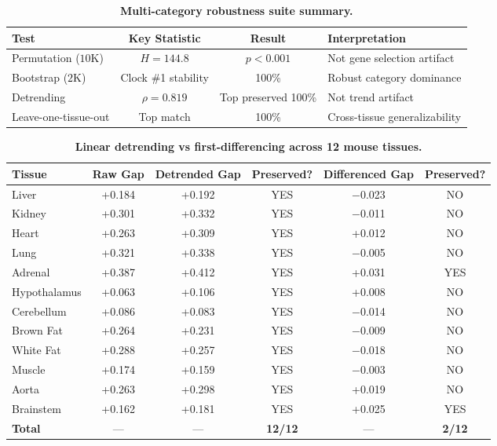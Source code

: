 \documentclass[11pt,letterpaper]{article}
\begin{document}
\begin{table}[H]
\centering
\caption{\textbf{Multi-category robustness suite summary.}}
\label{tab:multicat_robust}
\begin{tabular}{lccl}
\toprule
\textbf{Test} & \textbf{Key Statistic} & \textbf{Result} & \textbf{Interpretation} \\
\midrule
Permutation ($10$K) & $H = 144.8$ & $p < 0.001$ & Not gene selection artifact \\
Bootstrap ($2$K) & Clock \#1 stability & 100\% & Robust category dominance \\
Detrending & $\rho = 0.819$ & Top preserved 100\% & Not trend artifact \\
Leave-one-tissue-out & Top match & 100\% & Cross-tissue generalizability \\
\bottomrule
\end{tabular}
\end{table}

\begin{table}[H]
\centering
\caption{\textbf{Linear detrending vs first-differencing across 12 mouse tissues.}}
\label{tab:detrend}
\begin{tabular}{lccccc}
\toprule
Tissue & Raw Gap & Detrended Gap & Preserved? & Differenced Gap & Preserved? \\
\midrule
Liver & +0.184 & +0.192 & YES & $-$0.023 & NO \\
Kidney & +0.301 & +0.332 & YES & $-$0.011 & NO \\
Heart & +0.263 & +0.309 & YES & +0.012 & NO \\
Lung & +0.321 & +0.338 & YES & $-$0.005 & NO \\
Adrenal & +0.387 & +0.412 & YES & +0.031 & YES \\
Hypothalamus & +0.063 & +0.106 & YES & +0.008 & NO \\
Cerebellum & +0.086 & +0.083 & YES & $-$0.014 & NO \\
Brown Fat & +0.264 & +0.231 & YES & $-$0.009 & NO \\
White Fat & +0.288 & +0.257 & YES & $-$0.018 & NO \\
Muscle & +0.174 & +0.159 & YES & $-$0.003 & NO \\
Aorta & +0.263 & +0.298 & YES & +0.019 & NO \\
Brainstem & +0.162 & +0.181 & YES & +0.025 & YES \\
\midrule
\textbf{Total} & --- & --- & \textbf{12/12} & --- & \textbf{2/12} \\
\bottomrule
\end{tabular}
\end{table}
\end{document}
